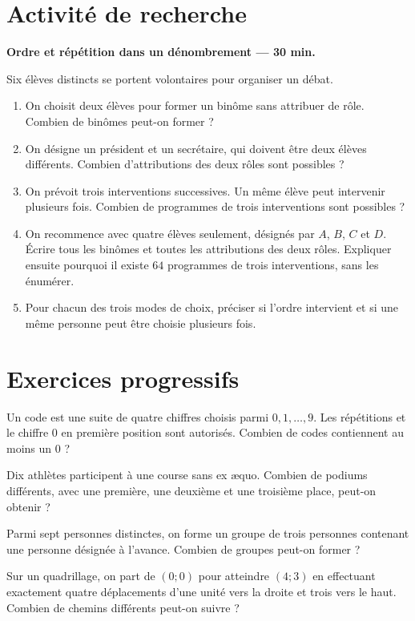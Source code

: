 \section{Activité de recherche}\textbf{Ordre et répétition dans un dénombrement --- 30 min.}\par Six élèves distincts se portent volontaires pour organiser un débat.
\begin{enumerate}\item On choisit deux élèves pour former un binôme sans attribuer de rôle. Combien de binômes peut-on former ?
\item On désigne un président et un secrétaire, qui doivent être deux élèves différents. Combien d'attributions des deux rôles sont possibles ?
\item On prévoit trois interventions successives. Un même élève peut intervenir plusieurs fois. Combien de programmes de trois interventions sont possibles ?
\item On recommence avec quatre élèves seulement, désignés par $A$, $B$, $C$ et $D$. Écrire tous les binômes et toutes les attributions des deux rôles. Expliquer ensuite pourquoi il existe $64$ programmes de trois interventions, sans les énumérer.
\item Pour chacun des trois modes de choix, préciser si l'ordre intervient et si une même personne peut être choisie plusieurs fois.\end{enumerate}

\section{Exercices progressifs}

Un code est une suite de quatre chiffres choisis parmi $0,1,\ldots,9$. Les répétitions et le chiffre $0$ en première position sont autorisés. Combien de codes contiennent au moins un $0$ ?

Dix athlètes participent à une course sans ex æquo. Combien de podiums différents, avec une première, une deuxième et une troisième place, peut-on obtenir ?

Parmi sept personnes distinctes, on forme un groupe de trois personnes contenant une personne désignée à l'avance. Combien de groupes peut-on former ?

Sur un quadrillage, on part de $(0;0)$ pour atteindre $(4;3)$ en effectuant exactement quatre déplacements d'une unité vers la droite et trois vers le haut. Combien de chemins différents peut-on suivre ?

